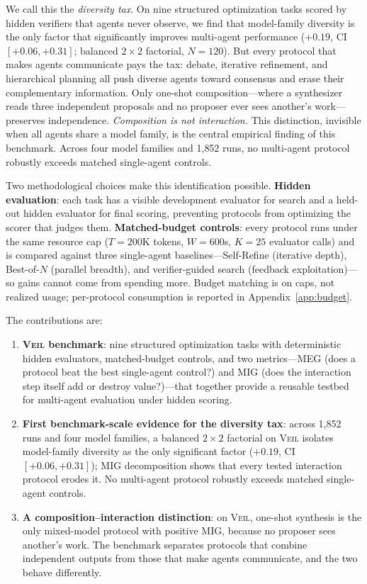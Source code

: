 \documentclass{article}
\begin{document}
We call this the \emph{diversity tax}. On nine structured optimization tasks scored by hidden verifiers that agents never observe, we find that model-family diversity is the only factor that significantly improves multi-agent performance ($+0.19$, CI $[+0.06, +0.31]$; balanced $2{\times}2$ factorial, $N{=}120$). But every protocol that makes agents communicate pays the tax: debate, iterative refinement, and hierarchical planning all push diverse agents toward consensus and erase their complementary information. Only one-shot composition---where a synthesizer reads three independent proposals and no proposer ever sees another's work---preserves independence. \emph{Composition is not interaction.} This distinction, invisible when all agents share a model family, is the central empirical finding of this benchmark. Across four model families and 1{,}852 runs, no multi-agent protocol robustly exceeds matched single-agent controls.

Two methodological choices make this identification possible. \textbf{Hidden evaluation}: each task has a visible development evaluator for search and a held-out hidden evaluator for final scoring, preventing protocols from optimizing the scorer that judges them. \textbf{Matched-budget controls}: every protocol runs under the same resource cap ($T{=}200$K tokens, $W{=}600$s, $K{=}25$ evaluator calls) and is compared against three single-agent baselines---Self-Refine (iterative depth), Best-of-$N$ (parallel breadth), and verifier-guided search (feedback exploitation)---so gains cannot come from spending more. Budget matching is on caps, not realized usage; per-protocol consumption is reported in Appendix~\ref{app:budget}.

The contributions are:

\begin{enumerate}
\item \textbf{\textsc{Veil} benchmark}: nine structured optimization tasks with deterministic hidden evaluators, matched-budget controls, and two metrics---MEG (does a protocol beat the best single-agent control?) and MIG (does the interaction step itself add or destroy value?)---that together provide a reusable testbed for multi-agent evaluation under hidden scoring.
\item \textbf{First benchmark-scale evidence for the diversity tax}: across 1{,}852 runs and four model families, a balanced $2{\times}2$ factorial on \textsc{Veil} isolates model-family diversity as the only significant factor ($+0.19$, CI $[+0.06, +0.31]$); MIG decomposition shows that every tested interaction protocol erodes it. No multi-agent protocol robustly exceeds matched single-agent controls.
\item \textbf{A composition--interaction distinction}: on \textsc{Veil}, one-shot synthesis is the only mixed-model protocol with positive MIG, because no proposer sees another's work. The benchmark separates protocols that combine independent outputs from those that make agents communicate, and the two behave differently.
\end{enumerate}
\end{document}
